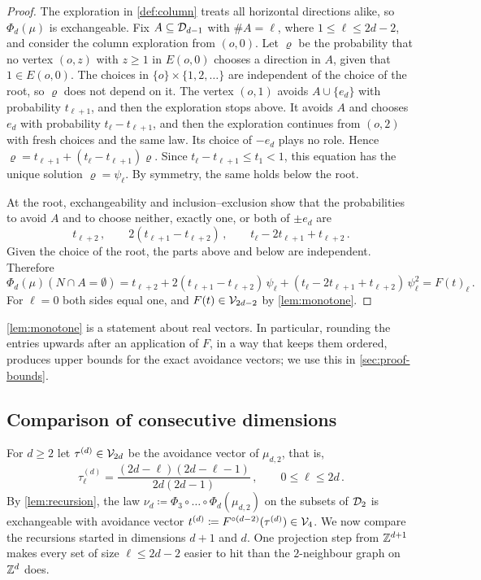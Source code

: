 \documentclass[11pt,letterpaper]{article}
\begin{document}
\begin{proof}
The exploration in \cref{def:column} treats all horizontal directions alike, so $\Phi_d(\mu)$ is exchangeable. Fix $A\subseteq\mathcal D_{d-1}$ with $\#A=\ell$, where $1\le\ell\le2d-2$, and consider the column exploration from $(o,0)$. Let $\varrho$ be the probability that no vertex $(o,z)$ with $z\ge1$ in $E(o,0)$ chooses a direction in $A$, given that $1\in E(o,0)$. The choices in $\{o\}\times\{1,2,\dots\}$ are independent of the choice of the root, so $\varrho$ does not depend on it. The vertex $(o,1)$ avoids $A\cup\{e_d\}$ with probability $t_{\ell+1}$, and then the exploration stops above. It avoids $A$ and chooses $e_d$ with probability $t_\ell-t_{\ell+1}$, and then the exploration continues from $(o,2)$ with fresh choices and the same law. Its choice of $-e_d$ plays no role. Hence $\varrho=t_{\ell+1}+(t_\ell-t_{\ell+1})\varrho$. Since $t_\ell-t_{\ell+1}\le t_1<1$, this equation has the unique solution $\varrho=\psi_\ell$. By symmetry, the same holds below the root.

At the root, exchangeability and inclusion--exclusion show that the probabilities to avoid $A$ and to choose neither, exactly one, or both of $\pm e_d$ are
\begin{equation*}
t_{\ell+2}\,,\qquad 2(t_{\ell+1}-t_{\ell+2})\,,\qquad t_\ell-2t_{\ell+1}+t_{\ell+2}\,.
\end{equation*}
Given the choice of the root, the parts above and below are independent. Therefore
\begin{equation*}
\Phi_d(\mu)(N\cap A=\emptyset)=t_{\ell+2}+2(t_{\ell+1}-t_{\ell+2})\,\psi_\ell+(t_\ell-2t_{\ell+1}+t_{\ell+2})\,\psi_\ell^2=F(t)_\ell\,.
\end{equation*}
For $\ell=0$ both sides equal one, and $F(t)\in\mathcal V_{2d-2}$ by \cref{lem:monotone}.
\end{proof}

\cref{lem:monotone} is a statement about real vectors. In particular, rounding the entries upwards after an application of $F$, in a way that keeps them ordered, produces upper bounds for the exact avoidance vectors; we use this in \cref{sec:proof-bounds}.

\subsection{Comparison of consecutive dimensions}\label{sec:closure}

For $d\ge2$ let $\tau^{(d)}\in\mathcal V_{2d}$ be the avoidance vector of $\mu_{d,2}$, that is,
\begin{equation*}
\tau^{(d)}_\ell=\frac{(2d-\ell)(2d-\ell-1)}{2d(2d-1)}\,,\qquad0\le\ell\le2d\,.
\end{equation*}
By \cref{lem:recursion}, the law $\nu_d\coloneqq\Phi_3\circ\dots\circ\Phi_d(\mu_{d,2})$ on the subsets of $\mathcal D_2$ is exchangeable with avoidance vector $t^{(d)}\coloneqq F^{\circ(d-2)}(\tau^{(d)})\in\mathcal V_4$. We now compare the recursions started in dimensions $d+1$ and $d$. One projection step from $\mathbb Z^{d+1}$ makes every set of size $\ell\le2d-2$ easier to hit than the $2$-neighbour graph on $\mathbb Z^d$ does.
\end{document}
